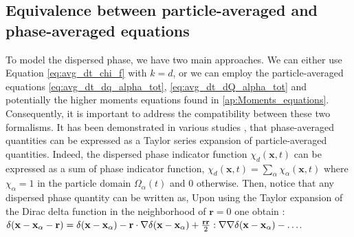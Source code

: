 
\subsection{Equivalence between particle-averaged and phase-averaged equations}
\label{sec:equivalence}
To model the dispersed phase, we have two main approaches. 
We can either use Equation \ref{eq:avg_dt_chi_f} with $k=d$, or we can employ the particle-averaged equations \ref{eq:avg_dt_dq_alpha_tot}, \ref{eq:avg_dt_dQ_alpha_tot} and potentially the higher moments equations found in \ref{ap:Moments_equations}.
Consequently, it is important to address the compatibility between these two formalisms.
It has been demonstrated in various studies \citep{lhuillier1992ensemble,jackson1997locally,zhang1994averaged}, that phase-averaged quantities can be expressed as a Taylor series expansion of particle-averaged quantities. 
Indeed, the dispersed phase indicator function $\chi_d(\textbf{x},t)$ can be expressed as a sum of phase indicator function, $\chi_d(\textbf{x},t) = \sum_\alpha\chi_\alpha(\textbf{x},t)$ where $\chi_\alpha =1$ in the particle domain $\Omega_\alpha(t)$ and $0$ otherwise. 
Then, notice that any dispersed phase quantity can be written as, 
Upon using the Taylor expansion of the Dirac delta function in the neighborhood of $\textbf{r}=0$ one obtain :  $\delta(\textbf{x}- \textbf{x}_\alpha - \textbf{r}) = \delta(\textbf{x}- \textbf{x}_\alpha) - \textbf{r}\cdot\mathbf{\nabla} \delta(\textbf{x} - \textbf{x}_\alpha) + \frac{\textbf{rr}}{2}:\mathbf{\nabla}\mathbf{\nabla}\delta(\textbf{x}- \textbf{x}_\alpha) - \ldots $.
